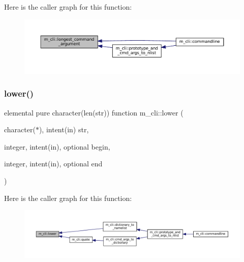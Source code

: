 Here is the caller graph for this function\+:
\nopagebreak
\begin{figure}[H]
\begin{center}
\leavevmode
\includegraphics[width=350pt]{namespacem__cli_aaf5504d3b48696a9d22fa5773c5a7d15_icgraph}
\end{center}
\end{figure}
\mbox{\label{namespacem__cli_a685574282a09c3f57e0c18654a3a642c}} 
\subsubsection{\texorpdfstring{lower()}{lower()}}
{\footnotesize\ttfamily elemental pure character(len(str)) function m\+\_\+cli\+::lower (\begin{DoxyParamCaption}\item[{character($\ast$), intent(in)}]{str,  }\item[{integer, intent(in), optional}]{begin,  }\item[{integer, intent(in), optional}]{end }\end{DoxyParamCaption})\hspace{0.3cm}{\ttfamily [private]}}

Here is the caller graph for this function\+:
\nopagebreak
\begin{figure}[H]
\begin{center}
\leavevmode
\includegraphics[width=350pt]{namespacem__cli_a685574282a09c3f57e0c18654a3a642c_icgraph}
\end{center}
\end{figure}
\mbox{\label{namespacem__cli_a5b6abaf1d5aec5e918be0759df29c849}} 
